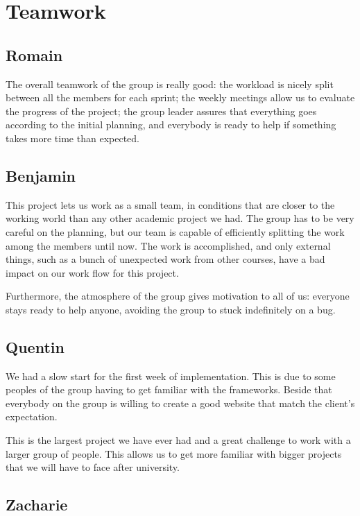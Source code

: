 \section{Teamwork}

\subsection{Romain}
The overall teamwork of the group is really good: the workload is nicely
split between all the members for each sprint; the weekly meetings allow
us to evaluate the progress of the project; the group leader assures that
everything goes according to the initial planning, and everybody is ready to
help if something takes more time than expected. \newline

\subsection{Benjamin}

This project lets us work as a small team, in conditions that are closer to
the working world than any other academic project we had. The group has to
be very careful on the planning, but our team is capable of efficiently
splitting the work among the members until now. The work is accomplished,
and only external things, such as a bunch of unexpected work from other
courses, have a bad impact on our work flow for this project. \newline

Furthermore, the atmosphere of the group gives motivation to all of us:
everyone stays ready to help anyone, avoiding the group to stuck
indefinitely on a bug.

\subsection{Quentin}
We had a slow start for the first week of implementation. This is due to
some peoples of the group having to get familiar with the frameworks.
Beside that everybody on the group is willing to create a good website that
match the client's expectation. \newline

This is the largest project we have ever had and a great challenge to work
with a larger group of people. This allows us to get more familiar with
bigger projects that we will have to face after university.

\subsection{Zacharie}

